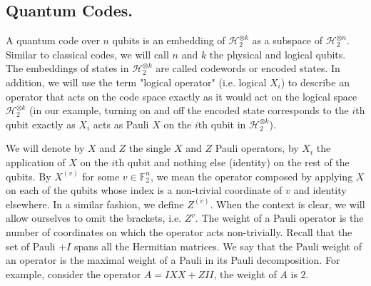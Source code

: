 \documentclass[manuscript,screen,review]{acmart}
\begin{document}
{%

\subsection{Quantum Codes.} \label{sec:quantum} A quantum code over $n$ qubits is an embedding of $\mathcal{H}_{2}^{\otimes k}$ as a subspace of $\mathcal{H}_{2}^{\otimes n}$. Similar to classical codes, we will call $n$ and $k$ the physical and logical qubits. The embeddings of states in $\mathcal{H}_{2}^{\otimes k}$ are called codewords or encoded states. In addition, we will use the term "logical operator" (i.e. logical $X_{i}$) to describe an operator that acts on the code space exactly as it would act on the logical space $\mathcal{H}_{2}^{\otimes k}$ (in our example, turning on and off the encoded state corresponds to the $i$th qubit exactly as $X_{i}$ acts as Pauli $X$ on the $i$th qubit in $\mathcal{H}_{2}^{\otimes k}$). 

We will denote by $X$ and $Z$ the single $X$ and $Z$ Pauli operators, by $X_{i}$ the application of $X$ on the $i$th qubit and nothing else (identity) on the rest of the qubits. By $X^{(v)}$ for some $v \in \mathbb{F}_{2}^{n}$, we mean the operator composed by applying $X$ on each of the qubits whose index is a non-trivial coordinate of $v$ and identity elsewhere. In a similar fashion, we define $Z^{(v)}$. When the context is clear, we will allow ourselves to omit the brackets, i.e. $Z^{v}$. The weight of a Pauli operator is the number of coordinates on which the operator acts non-trivially. Recall that the set of Pauli $+ I$ spans all the Hermitian matrices. We say that the Pauli weight of an operator is the maximal weight of a Pauli in its Pauli decomposition. For example, consider the operator $A = IXX + ZII$, the weight of $A$ is $2$.

}
\end{document}
